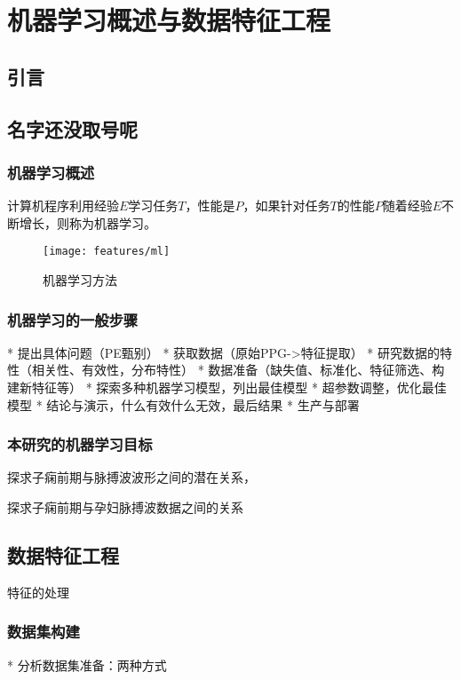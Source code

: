 \chapter{机器学习概述与数据特征工程}
\section{引言}


\section{名字还没取号呢}
\subsection{机器学习概述}

计算机程序利用经验$E$学习任务$T$，性能是$P$，如果针对任务$T$的性能$P$随着经验$E$不断增长，则称为机器学习。
\begin{figure}[htbp]
  \centering
  \texttt{[image: features/ml]}
  \caption[机器学习方法]{\label{fig:ml}机器学习方法\cite{Aurélien2018}}
\end{figure}

\subsection{机器学习的一般步骤}

* 提出具体问题（PE甄别）
* 获取数据（原始PPG->特征提取）
* 研究数据的特性（相关性、有效性，分布特性）
* 数据准备（缺失值、标准化、特征筛选、构建新特征等）
* 探索多种机器学习模型，列出最佳模型
* 超参数调整，优化最佳模型
* 结论与演示，什么有效什么无效，最后结果
* 生产与部署

\subsection{本研究的机器学习目标}
探求子痫前期与脉搏波波形之间的潜在关系，

探求子痫前期与孕妇脉搏波数据之间的关系


\section{数据特征工程}
特征的处理

\subsection{数据集构建}
* 分析数据集准备：两种方式

